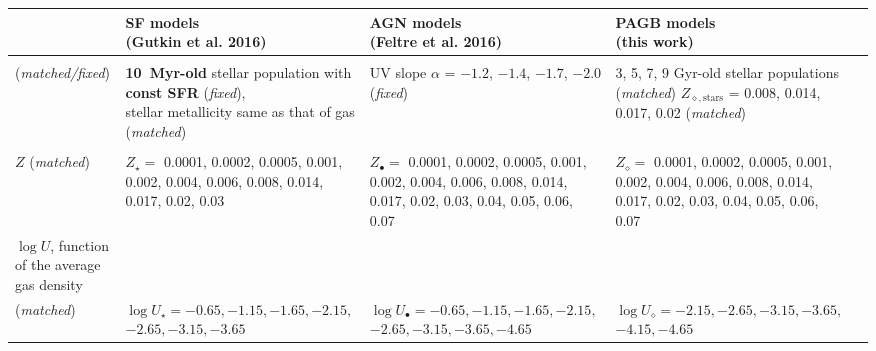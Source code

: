 \documentclass[fleqn,usenatbib]{mnras}
\begin{document}
\begin{table*}
\centering
\begin{tabular}{ | p{3.5cm} || p{4cm} p{4cm} p{4cm} p{0.001cm}|} 
\centering{{\bf Parameter space}} & \centering{{\bf SF models}\\ (Gutkin et al. 2016)}
 & \centering{{\bf AGN models}\\
  (Feltre et al. 2016)}
  & \centering{{\bf PAGB models}\\ (this work)} & \\ \hline \hline

\centering{\bf Ionizing spectrum}\\ ({\it matched/fixed})  &
\centering{{\bf 10~Myr-old} stellar population with {\bf const SFR}
                                                                                 ({\it fixed}),\\ 
stellar metallicity same as that of gas ({\it matched})} 
& \centering{UV slope $\alpha$ =
                                       $-1.2$, $-1.4$, $\boldsymbol{-1.7}$,  $-2.0$\\
  ({\it fixed})} & \centering{
                                                           3, 5, 7, 9 Gyr-old stellar
                                                     populations\\
  ({\it matched})\\
$Z_{\diamond, \mathrm{stars}}$ = 0.008, 0.014, 0.017, 0.02 ({\it matched})} &
  \\ \hline 

\centering{\bf Interstellar metallicity} \\ $Z$ ({\it matched})  &  
\centering{$Z_{\star} =$\\ 0.0001, 0.0002, 0.0005, 0.001, 0.002, 0.004,
0.006, 0.008, 0.014, 0.017, 0.02, 0.03}
& 
\centering{$Z_{\bullet} = $\\ 0.0001, 0.0002, 0.0005, 0.001, 0.002, 0.004,
0.006, 0.008, 0.014, 0.017, 0.02, 0.03, 0.04, 0.05, 0.06, 0.07}   
&  \centering{$Z_{\diamond} = $\\ 0.0001, 0.0002, 0.0005, 0.001, 0.002, 0.004,
0.006, 0.008, 0.014, 0.017, 0.02, 0.03, 0.04, 0.05, 0.06, 0.07} &
  \\ \hline

\centering{\bf Ionization parameter}  $\log U$, function of the average gas
  density\\ ({\it matched})  &  
\centering{\bf $\log U_{\star} = -0.65, -1.15, -1.65, -2.15, $\\
                                                                              $-2.65,
  -3.15,  -3.65$}
& \centering{\bf $\log U_{\bullet} = -0.65,
                              -1.15, -1.65, -2.15, $\\ $-2.65, -3.15, -3.65,
  -4.65$} 
  &  \centering{\bf $\log U_{\diamond} = -2.15, -2.65, -3.15, -3.65,
    $\\ $-4.15, -4.65$} &
  \\ \hline
    

\end{tabular}
\end{table*}
\end{document}
